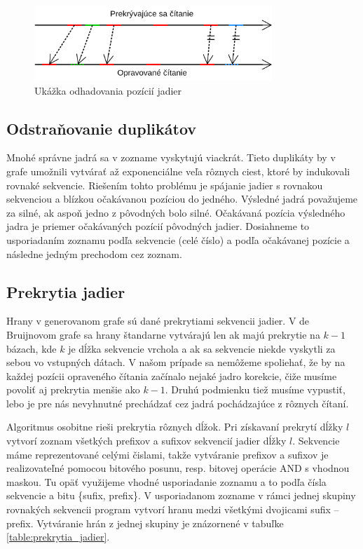 \begin{figure}
    \centering
    \includegraphics[width=0.8\textwidth]{images/odhadovanie_pozicie.png}
    \caption{Ukážka odhadovania pozícií jadier}
    \label{fig:odhadovanie_pozicie}
\end{figure} 

\subsection{Odstraňovanie duplikátov}

Mnohé správne jadrá sa v zozname vyskytujú viackrát. Tieto duplikáty by v grafe umožnili vytvárať až exponenciálne veľa rôznych ciest, ktoré by indukovali rovnaké sekvencie. Riešením tohto problému je spájanie jadier s rovnakou sekvenciou a blízkou očakávanou pozíciou do jedného. Výsledné jadrá považujeme za silné, ak aspoň jedno z pôvodných bolo silné. Očakávaná pozícia výsledného jadra je priemer očakávaných pozícií pôvodných jadier. Dosiahneme to usporiadaním zoznamu podľa sekvencie (celé číslo) a podľa očakávanej pozície a následne jedným prechodom cez zoznam. 

\subsection{Prekrytia jadier}

Hrany v generovanom grafe sú dané prekrytiami sekvencii jadier. V de Bruijnovom grafe sa hrany štandarne vytvárajú len ak majú prekrytie na $k - 1$ bázach, kde $k$ je dĺžka sekvencie vrchola a ak sa sekvencie niekde vyskytli za sebou vo vstupných dátach. V našom prípade sa nemôžeme spoliehať, že by na každej pozícii opraveného čítania začínalo nejaké jadro korekcie, čiže musíme povoliť aj prekrytia menšie ako $k - 1$. Druhú podmienku tiež musíme vypustiť, lebo je pre nás nevyhnutné prechádzať cez jadrá pochádzajúce z rôznych čítaní. 

Algoritmus osobitne rieši prekrytia rôznych dĺžok. Pri získavaní prekrytí dĺžky $l$ vytvorí zoznam všetkých prefixov a sufixov sekvencií jadier dĺžky $l$. Sekvencie máme reprezentované celými čislami, takže vytváranie prefixov a sufixov je realizovateľné pomocou bitového posunu, resp. bitovej operácie AND s vhodnou maskou. Tu opäť využijeme vhodné usporiadanie zoznamu a to podľa čísla sekvencie a bitu \{sufix, prefix\}. V usporiadanom zozname v rámci jednej skupiny rovnakých sekvencii program vytvorí hranu medzi všetkými dvojicami sufix -- prefix. Vytváranie hrán z jednej skupiny je znázornené v tabuľke \ref{table:prekrytia_jadier}.


